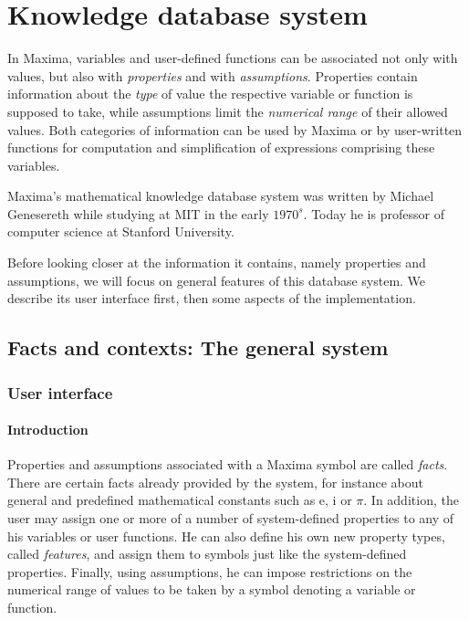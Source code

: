 \documentclass[../Maxima_Workbook.tex]{subfiles}
\begin{document}
	
\chapter{Knowledge database system}

In Maxima, variables and user-defined functions can be associated not only with values, but also with \emph{properties} and with \emph{assumptions}. Properties contain information about the \emph{type} of value the respective variable or function is supposed to take, while assumptions limit the \emph{numerical range} of their allowed values. Both categories of information can be used by Maxima or by user-written functions for computation and simplification of expressions comprising these variables.

\lz Maxima's mathematical knowledge database system was written by Michael Genesereth while studying at MIT in the early $1970^s$. Today he is professor of computer science at Stanford University.

\lz Before looking closer at the information it contains, namely properties and assumptions, we will focus on general features of this database system. We describe its user interface first, then some aspects of the implementation.

\section{Facts and contexts: The general system}

\subsection{User interface}

\subsubsection{Introduction}

Properties and assumptions associated with a Maxima symbol are called \emph{facts}. There are certain facts already provided by the system, for instance about general and predefined mathematical constants such as e, i or $ \pi $. In addition, the user may assign one or more of a number of system-defined properties to any of his variables or user functions. He can also define his own new property types, called \emph{features}, and assign them to symbols just like the system-defined properties. Finally, using assumptions, he can impose restrictions on the numerical range of values to be taken by a symbol denoting a variable or function.
\end{document}
